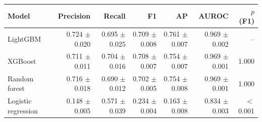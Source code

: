 \begin{tabular}{lrrrrrr}
\toprule
Model & Precision & Recall & F1 & AP & AUROC & $p$ (F1) \\
\midrule
LightGBM & 0.724 $\pm$ 0.020 & 0.695 $\pm$ 0.025 & 0.709 $\pm$ 0.008 & 0.761 $\pm$ 0.007 & 0.969 $\pm$ 0.002 & -- \\
XGBoost & 0.711 $\pm$ 0.011 & 0.704 $\pm$ 0.016 & 0.708 $\pm$ 0.007 & 0.754 $\pm$ 0.007 & 0.969 $\pm$ 0.001 & 1.000 \\
Random forest & 0.716 $\pm$ 0.018 & 0.690 $\pm$ 0.012 & 0.702 $\pm$ 0.005 & 0.754 $\pm$ 0.008 & 0.969 $\pm$ 0.001 & 1.000 \\
Logistic regression & 0.148 $\pm$ 0.005 & 0.571 $\pm$ 0.039 & 0.234 $\pm$ 0.004 & 0.163 $\pm$ 0.008 & 0.834 $\pm$ 0.003 & $<$0.001 \\
\bottomrule
\end{tabular}
